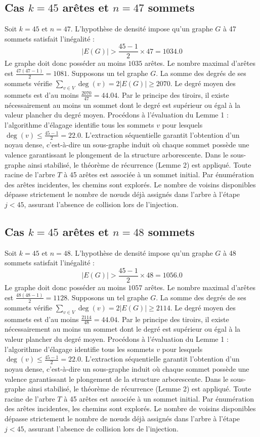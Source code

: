 \documentclass[12pt,a4paper]{article}
\begin{document}
\subsection{Cas $k = 45$ arêtes et $n = 47$ sommets}
Soit $k = 45$ et $n = 47$. L'hypothèse de densité impose qu'un graphe $G$ à 47 sommets satisfait l'inégalité :
$$ |E(G)| > \frac{45-1}{2} \times 47 = 1034.0 $$
Le graphe doit donc posséder au moins $1035$ arêtes. Le nombre maximal d'arêtes est $\frac{47(47-1)}{2} = 1081$.
Supposons un tel graphe $G$. La somme des degrés de ses sommets vérifie $\sum_{v \in V} \deg(v) = 2|E(G)| \geq 2070$.
Le degré moyen des sommets est d'au moins $\frac{2070}{47} = 44.04$.
Par le principe des tiroirs, il existe nécessairement au moins un sommet dont le degré est supérieur ou égal à la valeur plancher du degré moyen.
Procédons à l'évaluation du Lemme 1 : l'algorithme d'élagage identifie tous les sommets $v$ pour lesquels $\deg(v) \leq \frac{45-1}{2} = 22.0$.
L'extraction séquentielle garantit l'obtention d'un noyau dense, c'est-à-dire un sous-graphe induit où chaque sommet possède une valence garantissant le plongement de la structure arborescente.
Dans le sous-graphe ainsi stabilisé, le théorème de récurrence (Lemme 2) est appliqué. Toute racine de l'arbre $T$ à 45 arêtes est associée à un sommet initial. Par énumération des arêtes incidentes, les chemins sont explorés. Le nombre de voisins disponibles dépasse strictement le nombre de nœuds déjà assignés dans l'arbre à l'étape $j < 45$, assurant l'absence de collision lors de l'injection.

\subsection{Cas $k = 45$ arêtes et $n = 48$ sommets}
Soit $k = 45$ et $n = 48$. L'hypothèse de densité impose qu'un graphe $G$ à 48 sommets satisfait l'inégalité :
$$ |E(G)| > \frac{45-1}{2} \times 48 = 1056.0 $$
Le graphe doit donc posséder au moins $1057$ arêtes. Le nombre maximal d'arêtes est $\frac{48(48-1)}{2} = 1128$.
Supposons un tel graphe $G$. La somme des degrés de ses sommets vérifie $\sum_{v \in V} \deg(v) = 2|E(G)| \geq 2114$.
Le degré moyen des sommets est d'au moins $\frac{2114}{48} = 44.04$.
Par le principe des tiroirs, il existe nécessairement au moins un sommet dont le degré est supérieur ou égal à la valeur plancher du degré moyen.
Procédons à l'évaluation du Lemme 1 : l'algorithme d'élagage identifie tous les sommets $v$ pour lesquels $\deg(v) \leq \frac{45-1}{2} = 22.0$.
L'extraction séquentielle garantit l'obtention d'un noyau dense, c'est-à-dire un sous-graphe induit où chaque sommet possède une valence garantissant le plongement de la structure arborescente.
Dans le sous-graphe ainsi stabilisé, le théorème de récurrence (Lemme 2) est appliqué. Toute racine de l'arbre $T$ à 45 arêtes est associée à un sommet initial. Par énumération des arêtes incidentes, les chemins sont explorés. Le nombre de voisins disponibles dépasse strictement le nombre de nœuds déjà assignés dans l'arbre à l'étape $j < 45$, assurant l'absence de collision lors de l'injection.
\end{document}
